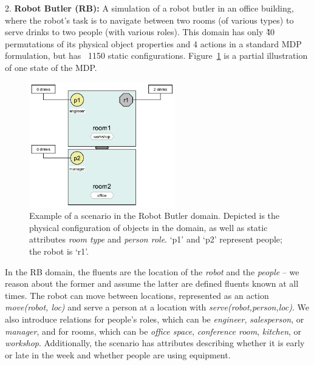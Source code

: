 



2. \textbf{Robot Butler (RB):} 
A simulation of a robot butler in an office building, where the robot's task is 
to navigate between two rooms (of various types) to serve drinks to two people 
(with various roles). This domain has only \~40 permutations of its physical 
object properties and 4 actions in a standard MDP formulation, but has ~1150 
static configurations. Figure~\ref{fig:robotbutler} is a partial illustration 
of one state of the MDP. 

\begin{figure}[t]
  \centerline{\includegraphics[width=2.5in]{robot-butler-domain}}
  \caption{Example of a scenario in the Robot Butler domain. Depicted is the 
  physical configuration of objects in the domain, as well as static attributes 
  \textit{room type} and \textit{person role}. `p1' and `p2' represent people; 
  the robot is `r1'.}
\label{fig:robotbutler} 
\vspace{1mm}
\end{figure}




In the RB domain, the fluents are the location of the \textit{robot} and the 
\textit{people} -- we reason about the former and assume the latter are defined 
fluents known at all times. The robot can move between locations, represented 
as an action \textit{move(robot, loc)} and serve a person at a location with 
\textit{serve(robot,person,loc)}. 
We also introduce relations for people's roles, which can be \textit{engineer}, 
\textit{salesperson}, or \textit{manager}, and for rooms, which can be 
\textit{office space}, \textit{conference room}, \textit{kitchen}, or 
\textit{workshop}. Additionally, the scenario has attributes describing whether 
it is early or late in the week and whether people are using equipment. 

